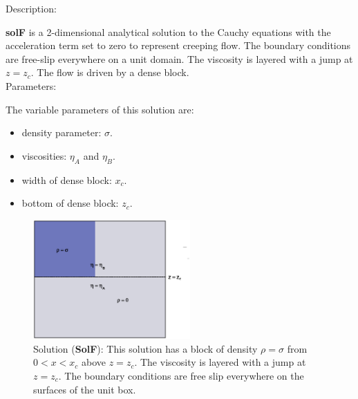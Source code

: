   {\large \fontB Description:}
  
  {\bf solF} is a 2-dimensional analytical solution to the Cauchy equations with the acceleration term set to zero
  to represent creeping flow. The boundary conditions are free-slip everywhere on a unit domain. The viscosity is layered with a jump at $ z=z_c $.
  The flow is driven by a dense block.
  \\

  {\large \fontB Parameters:}
 
 The variable parameters of this solution are:
 \begin{itemize}
   \item{density parameter: $ \sigma $.}
   \item{viscosities: $\eta_A$ and $\eta_B$.}
   \item{width of dense block: $x_c$.}
   \item{bottom of dense block: $z_c$.}
 \end{itemize}

  \begin{figure}
    \includegraphics[width=6cm,clip]{../figs/figF.eps}
    \caption[Short caption]{\label{figF} 
      Solution ({\bf SolF}):
      This solution has a block of density $\rho = \sigma$ from $0 < x < x_c$ above
      $ z= z_c$.
      The viscosity is layered with a jump at $ z=z_c $.
      The boundary conditions are free slip everywhere on the surfaces of the unit box.}
  \end{figure} 
  

